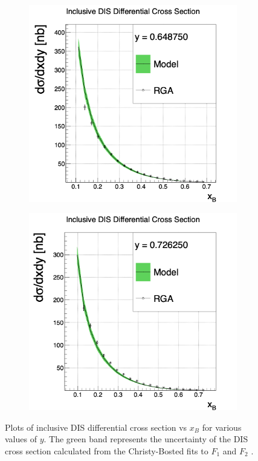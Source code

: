 \begin{figure}[h!]
	\centering
	\begin{subfigure}[b]{0.38\linewidth}
		\includegraphics[width=\linewidth]{figures/rga/xsec_4.png}
		\label{fig:rga_xsec4}
	\end{subfigure}
	\begin{subfigure}[b]{0.38\textwidth}
		\includegraphics[width=\linewidth]{figures/rga/xsec_5.png}
		\label{fig:rga_xsec5}
	\end{subfigure}
	\caption{Plots of inclusive DIS differential cross section vs $x_B$ for various values of $y$. The green band represents the uncertainty of the DIS cross section calculated from the Christy-Bosted fits to $F_1$ and $F_2$ \cite{christy_bosted}.}
	\label{fig:rga_xsec_plots}
\end{figure}


